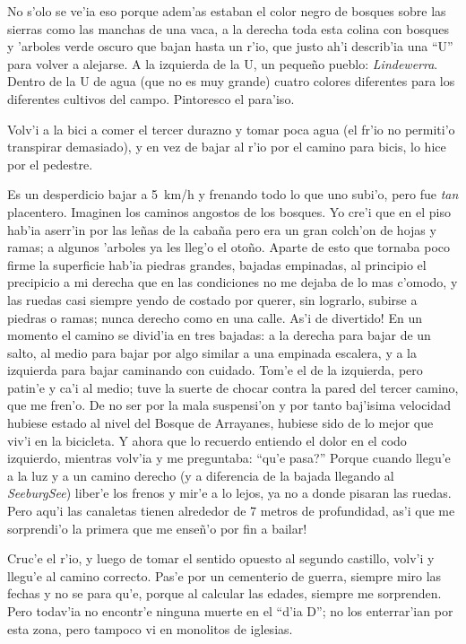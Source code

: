 No s'olo se ve'ia eso porque adem'as estaban el color negro de bosques sobre las
sierras como las manchas de una vaca, a la derecha toda esta colina con bosques
y 'arboles verde oscuro que bajan hasta un r'io, que justo ah'i describ'ia una
``{\small U}'' para volver a alejarse. A la izquierda de la {\small U}, un
peque\~no pueblo: {\sl Lindewerra}. Dentro de la {\small U} de agua (que no es
muy grande) cuatro colores diferentes para los diferentes cultivos del campo.
Pintoresco el para'iso.

Volv'i a la bici a comer el tercer durazno y tomar poca agua (el fr'io no
permiti'o transpirar demasiado), y en vez de bajar al r'io por el camino para
bicis, lo hice por el pedestre.

Es un desperdicio bajar a 5~km/h y frenando todo lo que uno subi'o, pero fue
{\sl tan} placentero. Imaginen los caminos angostos de los bosques. Yo cre'i
que en el piso hab'ia aserr'in por las le\~nas de la caba\~na pero era un gran
colch'on de hojas y ramas; a algunos 'arboles ya les lleg'o el oto\~no. Aparte
de esto que tornaba poco firme la superficie hab'ia piedras grandes, bajadas
empinadas, al principio el precipicio a mi derecha que en las condiciones no me
dejaba de lo mas c'omodo, y las ruedas casi siempre yendo de costado por querer,
sin lograrlo, subirse a piedras o ramas; nunca derecho como en una calle.
\textexclamdown As'i de divertido! En un momento el camino se divid'ia en tres
bajadas: a la derecha para bajar de un salto, al medio para bajar por algo
similar a una empinada escalera, y a la izquierda para bajar caminando con
cuidado. Tom'e el de la izquierda, pero patin'e y ca'i al medio; tuve la suerte
de chocar contra la pared del tercer camino, que me fren'o. De no ser por la
mala suspensi'on y por tanto baj'isima velocidad hubiese estado al nivel del
Bosque de Arrayanes, hubiese sido de lo mejor que viv'i en la bicicleta. Y ahora
que lo recuerdo entiendo el dolor en el codo izquierdo, mientras volv'ia y me
preguntaba: ``\textquestiondown qu'e pasa?'' Porque cuando llegu'e a la luz y a
un camino derecho (y a diferencia de la bajada llegando al {\sl SeeburgSee})
liber'e los frenos y mir'e a lo lejos, ya no a donde pisaran las ruedas. Pero
aqu'i las canaletas tienen alrededor de 7 metros de profundidad, \textexclamdown
as'i que me sorprendi'o la primera que me ense\~n'o por fin a bailar!

Cruc'e el r'io, y luego de tomar el sentido opuesto al segundo castillo, volv'i
y llegu'e al camino correcto. Pas'e por un cementerio de guerra, siempre miro
las fechas y no se para qu'e, porque al calcular las edades, siempre me
sorprenden. Pero todav'ia no encontr'e ninguna muerte en el ``d'ia D'';
no los enterrar'ian por esta zona, pero tampoco vi en monolitos de iglesias.

